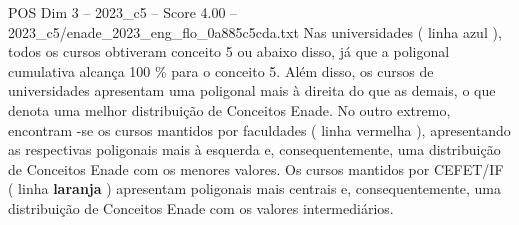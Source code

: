 \begin{textsample}{POS Dim 3 – 2023\_c5 – Score 4.00 – 2023\_c5/enade\_2023\_eng\_flo\_0a885c5cda.txt}
Nas universidades ( linha azul ), todos os cursos obtiveram conceito 5 ou abaixo disso, já que a poligonal cumulativa alcança 100 \% para o conceito 5.
Além disso, os cursos de universidades apresentam uma poligonal mais à direita do que as demais, o que denota uma melhor distribuição de Conceitos Enade.
No outro extremo, encontram -se os cursos mantidos por faculdades ( linha vermelha ), apresentando as respectivas poligonais mais à esquerda e, consequentemente, uma distribuição de Conceitos Enade com os menores valores.
Os cursos mantidos por CEFET/IF ( linha \textbf{laranja} ) apresentam poligonais mais centrais e, consequentemente, uma distribuição de Conceitos Enade com os valores intermediários.

\end{textsample}
